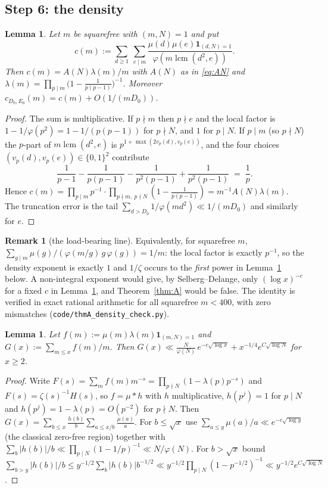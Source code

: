 \documentclass[11pt,a4paper]{article}
\theoremstyle{plain}
\newtheorem{lemma}[theorem]{Lemma}
\theoremstyle{definition}
\newtheorem{remark}[theorem]{Remark}
\DeclareMathOperator{\lcm}{lcm}
\begin{document}
\subsection{Step 6: the density}

\begin{lemma}\label{lem:density}
Let $m$ be squarefree with $(m,N)=1$ and put
\[
  c(m):=\sum_{d\ge1}\ \sum_{e\mid m}
     \frac{\mu(d)\mu(e)\mathbf 1_{(d,N)=1}}{\varphi(m\lcm(d^2,e))} .
\]
Then $c(m)=A(N)\lambda(m)/m$ with $A(N)$ as in \eqref{eq:AN} and
$\lambda(m)=\prod_{p\mid m}\bigl(1-\tfrac{1}{p(p-1)}\bigr)^{-1}$.
Moreover $c_{D_0,E_0}(m)=c(m)+O(1/(mD_0))$.
\end{lemma}

\begin{proof}
The sum is multiplicative. If $p\nmid m$ then $p\nmid e$ and the local
factor is $1-1/\varphi(p^2)=1-1/(p(p-1))$ for $p\nmid N$, and $1$ for
$p\mid N$. If $p\mid m$ (so $p\nmid N$) the $p$-part of
$m\lcm(d^2,e)$ is $p^{1+\max(2v_p(d),v_p(e))}$, and the four choices
$(v_p(d),v_p(e))\in\{0,1\}^2$ contribute
\[
  \frac{1}{p-1}-\frac{1}{p(p-1)}-\frac{1}{p^2(p-1)}+\frac{1}{p^2(p-1)}
  \;=\;\frac{1}{p}.
\]
Hence $c(m)=\prod_{p\mid m}p^{-1}\cdot
\prod_{p\nmid m,\ p\nmid N}(1-\tfrac{1}{p(p-1)})
= m^{-1}A(N)\lambda(m)$. The truncation error is the tail
$\sum_{d>D_0}1/\varphi(md^2)\ll 1/(mD_0)$ and similarly for $e$.
\end{proof}

\begin{remark}[the load-bearing line]\label{rem:loadbearing}
Equivalently, for squarefree $m$,
$\sum_{g\mid m}\mu(g)/(\varphi(m/g)\,g\,\varphi(g))=1/m$: the local
factor is exactly $p^{-1}$, so the density exponent is exactly $1$ and
$1/\zeta$ occurs to the \emph{first} power in Lemma~\ref{lem:mu}
below. A non-integral exponent would give, by Selberg--Delange, only
$(\log x)^{-c}$ for a fixed $c$ in Lemma~\ref{lem:mu}, and
Theorem~\ref{thm:A} would be false. The identity is verified in exact
rational arithmetic for all squarefree $m<400$, with zero mismatches
(\texttt{code/thmA\_density\_check.py}).
\end{remark}

\begin{lemma}\label{lem:mu}
Let $f(m):=\mu(m)\lambda(m)\mathbf 1_{(m,N)=1}$ and
$G(x):=\sum_{m\le x}f(m)/m$. Then
$G(x)\ll \frac{N}{\varphi(N)}\,e^{-c\sqrt{\log x}}
 + x^{-1/4}e^{C\sqrt{\log N}}$
for $x\ge2$.
\end{lemma}

\begin{proof}
Write $F(s)=\sum_m f(m)m^{-s}=\prod_{p\nmid N}(1-\lambda(p)p^{-s})$ and
$F(s)=\zeta(s)^{-1}H(s)$, so $f=\mu*h$ with $h$ multiplicative,
$h(p^j)=1$ for $p\mid N$ and $h(p^j)=1-\lambda(p)=O(p^{-2})$ for
$p\nmid N$. Then
$G(x)=\sum_{b\le x}\frac{h(b)}{b}\sum_{a\le x/b}\frac{\mu(a)}{a}$.
For $b\le\sqrt x$ use
$\sum_{a\le y}\mu(a)/a\ll e^{-c\sqrt{\log y}}$ (the classical
zero-free region) together with
$\sum_b|h(b)|/b\ll\prod_{p\mid N}(1-1/p)^{-1}\ll N/\varphi(N)$. For
$b>\sqrt x$ bound $\sum_{b>y}|h(b)|/b\le
y^{-1/2}\sum_b|h(b)|b^{-1/2}\ll y^{-1/2}\prod_{p\mid N}(1-p^{-1/2})^{-1}
\ll y^{-1/2}e^{C\sqrt{\log N}}$.
\end{proof}
\end{document}
